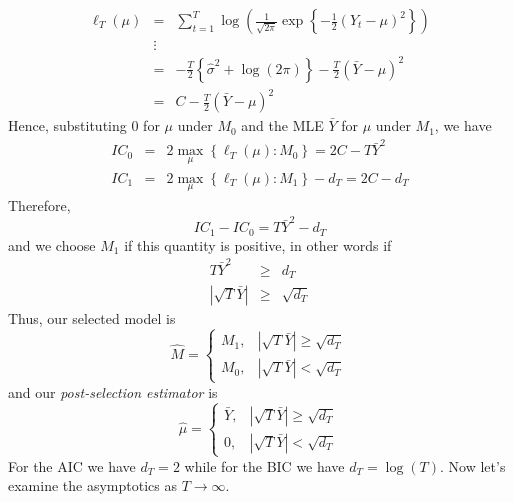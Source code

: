 \begin{eqnarray*}
  \ell_T(\mu)&=& \sum_{t=1}^T \log \left( \frac{1}{\sqrt{2\pi}} \exp \left\{-\frac{1}{2}(Y_t - \mu)^2 \right\}\right)\\
	&\vdots&\\ 
	&=& -\frac{T}{2} \left\{ \widehat{\sigma}^2 + \log(2\pi)\right\} - \frac{T}{2}\left(\bar{Y} - \mu \right)^2\\
	&=& C - \frac{T}{2}\left(\bar{Y} - \mu \right)^2
\end{eqnarray*}
Hence, substituting $0$ for $\mu$ under $M_0$ and the MLE $\bar{Y}$ for $\mu$ under $M_1$, we have
	\begin{eqnarray*}
		IC_0 &=& 2 \max_\mu \left\{\ell_T(\mu)\colon M_0 \right\} = 2C - T\bar{Y}^2\\
		IC_1 &=&2 \max_\mu \left\{\ell_T(\mu)\colon M_1 \right\} - d_T = 2C - d_T
	\end{eqnarray*}
Therefore,
	$$IC_1 - IC_0 = T\bar{Y}^2 - d_T$$
and we choose $M_1$ if this quantity is positive, in other words if
	\begin{eqnarray*}
		T\bar{Y}^2 &\geq& d_T\\
		\left|\sqrt{T} \bar{Y} \right| &\geq& \sqrt{d_T}
	\end{eqnarray*}
Thus, our selected model is 
	$$\widehat{M} = \left\{\begin{array}
		{cc} M_1, & |\sqrt{T}\bar{Y} | \geq \sqrt{d_T} \\
		M_0, & |\sqrt{T}\bar{Y} |  < \sqrt{d_T}
	\end{array} \right.$$
and our \emph{post-selection estimator} is 
	$$\widehat{\mu}=\left\{\begin{array}
		{cc} \bar{Y}, & |\sqrt{T}\bar{Y} | \geq \sqrt{d_T} \\
		0, & |\sqrt{T}\bar{Y} | < \sqrt{d_T}
		\end{array}\right.$$
For the AIC we have $d_T = 2$ while for the BIC we have $d_T = \log(T)$. Now let's examine the asymptotics as $T \rightarrow \infty$.

